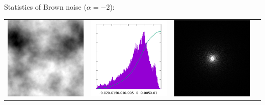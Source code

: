 


Statistics of Brown noise ($\alpha=-2$):

\begin{tabular}{cccc}
	\includegraphics{KK-2.png} &
	\includegraphics{KK-2_h.png} &
	\includegraphics{KK-2_f.png} &

\end{tabular}
